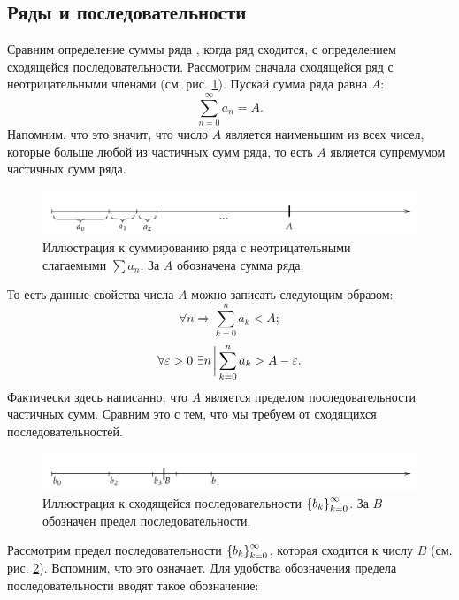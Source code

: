 \documentclass[12pt]{article}
\begin{document}
\subsection{Ряды и последовательности}
Сравним определение суммы ряда \cite{sum}, когда ряд сходится, с определением сходящейся последовательности. Рассмотрим сначала сходящейся ряд с неотрицательными членами (см. рис. \ref{fig:7}). Пускай сумма ряда равна $A$:
\begin{equation}
    \sum_{n=0}^\infty a_n = A.
\end{equation}
Напомним, что это значит, что число $A$ является наименьшим из всех чисел, которые больше любой из частичных сумм ряда, то есть $A$ является супремумом частичных сумм ряда.
\begin{figure}[ht]
    \centering
    \includegraphics[width = 1\textwidth]{fig7.png}
    \caption{Иллюстрация к суммированию ряда с неотрицательными слагаемыми $\sum a_n$. За $A$ обозначена сумма ряда.}
    \label{fig:7}
\end{figure}
\par
То есть данные свойства числа $A$ можно записать следующим образом:
\begin{equation}\label{eq:10}
\forall n \Longrightarrow \sum_{k=0}^n a_k < A;
\end{equation}
\begin{equation}
\forall \varepsilon > 0\ \exists n \eval \sum_{k=0}^n a_k> A - \varepsilon.
\end{equation}
Фактически здесь написанно, что $A$ является пределом последовательности частичных сумм. Сравним это с тем, что мы требуем от сходящихся последовательностей.
\begin{figure}[ht]
    \centering
    \includegraphics[width = 1\textwidth]{fig8.png}
    \caption{Иллюстрация к сходящейся последовательности $\qty{b_k}_{k=0}^\infty$. За $B$ обозначен предел последовательности.}
    \label{fig:8}
\end{figure}
\par
Рассмотрим предел последовательности $\qty{b_k}_{k=0}^\infty$, которая сходится к числу $B$ (см. рис. \ref{fig:8}).
Вспомним, что это означает. Для удобства обозначения предела последовательности вводят такое обозначение:
\end{document}
